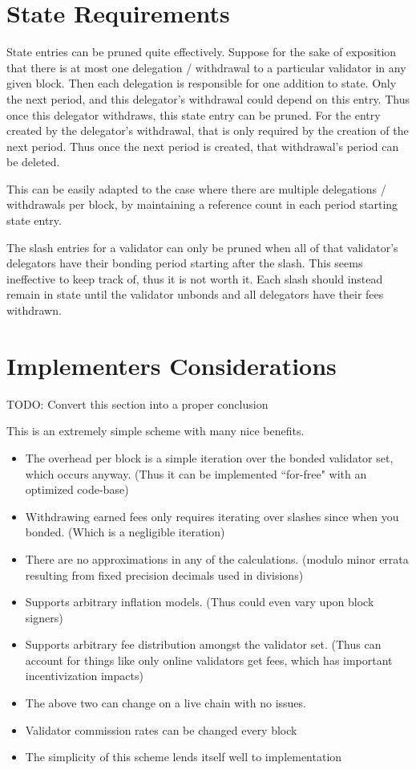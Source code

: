 \documentclass[]{article}
\begin{document}
\section{State Requirements}
State entries can be pruned quite effectively.
Suppose for the sake of exposition that there is at most one delegation / withdrawal to a particular validator in any given block.
Then each delegation is responsible for one addition to state.
Only the next period, and this delegator's withdrawal could depend on this entry. Thus once this delegator withdraws, this state entry can be pruned.
For the entry created by the delegator's withdrawal, that is only required by the creation of the next period.
Thus once the next period is created, that withdrawal's period can be deleted.

This can be easily adapted to the case where there are multiple delegations / withdrawals per block, by maintaining a reference count in each period starting state entry.

The slash entries for a validator can only be pruned when all of that validator's delegators have their bonding period starting after the slash.
This seems ineffective to keep track of, thus it is not worth it.
Each slash should instead remain in state until the validator unbonds and all delegators have their fees withdrawn.

\section{Implementers Considerations}
TODO: Convert this section into a proper conclusion

This is an extremely simple scheme with many nice benefits. 
\begin{itemize}
	\item The overhead per block is a simple iteration over the bonded validator set, which occurs anyway. (Thus it can be implemented ``for-free" with an optimized code-base)
	\item Withdrawing earned fees only requires iterating over slashes since when you bonded. (Which is a negligible iteration)
	\item There are no approximations in any of the calculations. (modulo minor errata resulting from fixed precision decimals used in divisions)
	\item Supports arbitrary inflation models. (Thus could even vary upon block signers)
	\item Supports arbitrary fee distribution amongst the validator set. (Thus can account for things like only online validators get fees, which has important incentivization impacts)
	\item The above two can change on a live chain with no issues.
	\item Validator commission rates can be changed every block
	\item The simplicity of this scheme lends itself well to implementation
\end{itemize}
\end{document}
